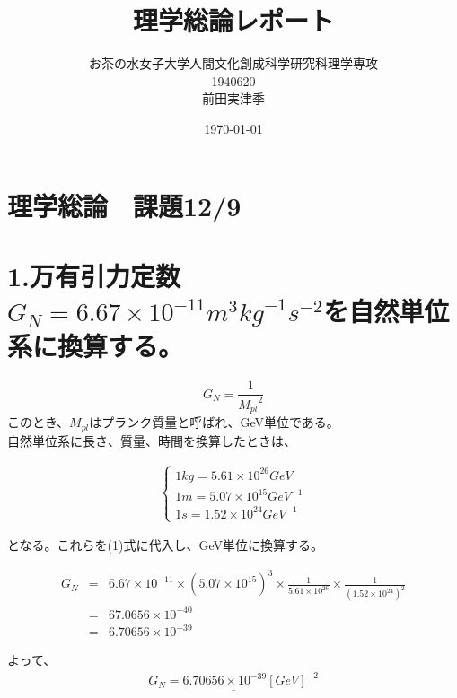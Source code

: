 \documentclass[10pt]{jreport}
\begin{document}
\title{理学総論レポート}

\author{お茶の水女子大学人間文化創成科学研究科理学専攻 \\1940620 \\ 前田実津季}
\date{\today}
\maketitle

\section*{理学総論　課題12/9}

\section*{1.万有引力定数$G_N=6.67\times10^{-11}m^3{kg}^{-1}s^{-2}$を自然単位系に換算する。}
\begin{equation}
G_N = \frac{1}{{M_{pl}}^2}
\end{equation}
このとき、$M_{pl}$はプランク質量と呼ばれ、GeV単位である。\\
自然単位系に長さ、質量、時間を換算したときは、

\begin{eqnarray}
\left \{ \begin{array}{ll}
	1kg 	= 5.61\times 10^{26} GeV \\
	1m = 5.07 \times 10^{15} GeV^{-1} \\
	1s = 1.52 \times 10^{24} GeV^{-1}	
\end{array} \right.
\end{eqnarray}

となる。これらを(1)式に代入し、GeV単位に換算する。

\begin{eqnarray}
G_N &=& 6.67 \times 10^{-11} \times (5.07\times 10^{15})^3 \times \frac{1}{5.61\times10^{26}} \times \frac{1}{(1.52\times10^{24})^2}  \nonumber \\
&=& 67.0656 \times 10^{-40} \nonumber \\
&=& 6.70656 \times 10^{-39}
\end{eqnarray}

よって、
\begin{eqnarray}
\underline{G_N = 6.70656 \times 10^{-39}  [GeV]^{-2}}
\end{eqnarray}
\end{document}
